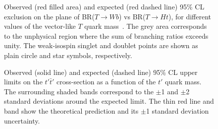 \begin{figure}[h!tb]\begin{center}
	\caption{Observed (red filled area) and expected (red dashed line) 95\% CL exclusion on the plane of BR($T\to Wb$) vs BR($T\to Ht$), 
for different values of the vector-like $T$ quark mass~\cite{ATLAS:2012qe}.  The
grey area corresponds to the unphysical region where the sum of branching ratios exceeds unity. 
The weak-isospin singlet and doublet points are shown as plain circle and star symbols, respectively.\label{fig:7tevwbwb}}
\end{center}\end{figure}
\begin{figure}[h!tb]\begin{center}
	\caption{Observed (solid line) and expected (dashed line) 95\% CL upper limits on the $t'\bar{t}'$
        cross-section as a function of the $t'$ quark mass. The surrounding shaded bands correspond 
        to the $\pm$1 and $\pm$2 standard deviations around the expected limit. 
        The thin red line and band show the theoretical prediction and its $\pm$1 standard deviation uncertainty. \label{fig:7tevCL}}
\end{center}\end{figure}
